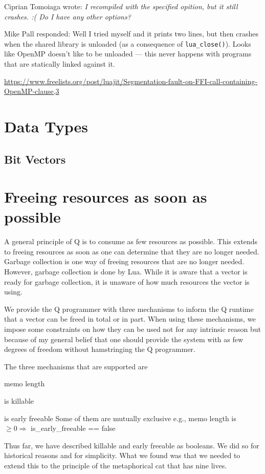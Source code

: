 Ciprian Tomoiaga wrote:
{\it I recompiled with the specified opition, but it still crashes. :(
Do I have any other options? }

Mike Pall responded: 
Well I tried myself and it prints two lines, but then crashes when
the shared library is unloaded (as a consequence of \verb+lua_close()+).
Looks like OpenMP doesn't like to be unloaded --- this never
happens with programs that are statically linked against it.

\url{https://www.freelists.org/post/luajit/Segmentation-fault-on-FFI-call-containing-OpenMP-clause,3}

\section{Data Types}

\subsection{Bit Vectors}


\section{Freeing resources as soon as possible}

A general principle of Q is to consume as few resources as possible. This
extends to freeing resources as soon as one can determine that they are no
longer needed. Garbage collection is one way of freeing resources that are no
longer needed. However, garbage collection is done by Lua. While it is aware
that a vector is ready for garbage collection, it is unaware of how much
resources the vector is using. 

We provide the Q programmer with three mechanisms to inform the Q runtime that a
vector can be freed in total or in part. When using these mechanisms, we
impose some constraints on how they can be used not for any intrinsic reason but
because of my general belief that one should provide the system with as few
degrees of freedom without hamstringing the Q programmer. 

The three mechanisms that are supported are 
\be
\item memo length
\item is killable
\item is early freeable
\ee
Some of them are mutually exclusive e.g., memo length is \(\geq 0 \Rightarrow\) is\_early\_freeable == false

Thus far, we have described killable and early freeable as booleans. We did so
for historical reasons and for simplicity. What we found was that we needed to
extend this to the principle of the metaphorical cat that has nine lives.

